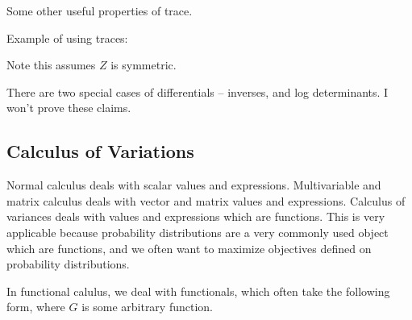 \documentclass[12pt]{article}
\begin{document}
Some other useful properties of trace.


Example of using traces:


Note this assumes $Z$ is symmetric.

There are two special cases of differentials -- inverses, and log determinants. I won't prove these claims.


\subsection{Calculus of Variations}

Normal calculus deals with scalar values and expressions. Multivariable and matrix calculus deals with vector and matrix values and expressions. Calculus of variances deals with values and expressions which are functions. This is very applicable because probability distributions are a very commonly used object which are functions, and we often want to maximize objectives defined on probability distributions.

In functional calulus, we deal with functionals, which often take the following form, where $G$ is some arbitrary function.

\end{document}
